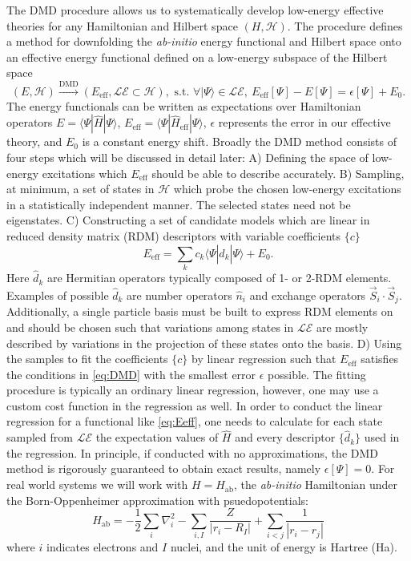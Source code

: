 \documentclass[12pt]{article}
\begin{document}
The DMD procedure allows us to systematically develop low-energy effective theories for any Hamiltonian and Hilbert space $(H, \mathcal{H})$.
The procedure defines a method for downfolding the \textit{ab-initio} energy functional and Hilbert space onto an effective energy functional defined on a low-energy subspace of the Hilbert space 
\begin{equation}
(E, \mathcal{H}) \xrightarrow{\text{DMD}} (E_\text{eff}, \mathcal{LE} \subset \mathcal{H}), \text{ s.t. }
\forall |\Psi\rangle \in \mathcal{LE}, \ E_\text{eff}[\Psi] - E[\Psi] = \epsilon[\Psi] + E_0.
\label{eq:DMD}
\end{equation} 
The energy functionals can be written as expectations over Hamiltonian operators $E = \langle \Psi | \hat{H} |\Psi \rangle$, $E_\text{eff} = \langle \Psi | \hat{H}_\text{eff} |\Psi \rangle$, $\epsilon$ represents the error in our effective theory, and $E_0$ is a constant energy shift.
Broadly the DMD method consists of four steps which will be discussed in detail later: 
A) Defining the space of low-energy excitations which $E_\text{eff}$ should be able to describe accurately.
B) Sampling, at minimum, a set of states in $\mathcal{H}$ which probe the chosen low-energy excitations in a statistically independent manner. The selected states need not be eigenstates. 
C) Constructing a set of candidate models which are linear in reduced density matrix (RDM) descriptors with variable coefficients $\{c\}$
\begin{equation}
E_\text{eff} = \sum_k c_k \langle \Psi | \hat{d}_k |\Psi \rangle + E_0.
\label{eq:Eeff}
\end{equation}
Here $\hat{d}_k$ are Hermitian operators typically composed of 1- or 2-RDM elements. 
Examples of possible $\hat{d}_k$ are number operators $\hat{n}_i$ and exchange operators $\vec{S}_i \cdot \vec{S}_j$.
Additionally, a single particle basis must be built to express RDM elements on and should be chosen such that variations among states in $\mathcal{LE}$ are mostly described by variations in the projection of these states onto the basis.
D) Using the samples to fit the coefficients $\{c\}$ by linear regression such that $E_\text{eff}$ satisfies the conditions in \eqref{eq:DMD} with the smallest error $\epsilon$ possible. 
The fitting procedure is typically an ordinary linear regression, however, one may use a custom cost function in the regression as well. 
In order to conduct the linear regression for a functional like \eqref{eq:Eeff}, one needs to calculate for each state sampled from $\mathcal{LE}$ the expectation values of $\hat{H}$ and every descriptor $\{\hat{d}_k\}$ used in the regression.
In principle, if conducted with no approximations, the DMD method is rigorously guaranteed to obtain exact results, namely $\epsilon[\Psi] = 0$.
For real world systems we will work with $H = H_\text{ab}$, the \textit{ab-initio} Hamiltonian under the Born-Oppenheimer approximation with psuedopotentials:
\begin{equation}
\hat{H}_\text{ab} = -\frac{1}{2} \sum_{i} \nabla_i^2 - \sum_{i,I}\frac{Z}{|r_i - R_I|} + \sum_{i<j}\frac{1}{|r_i - r_j|}
\label{eq:Hab}
\end{equation}
where $i$ indicates electrons and $I$ nuclei, and the unit of energy is Hartree (Ha).
\end{document}
